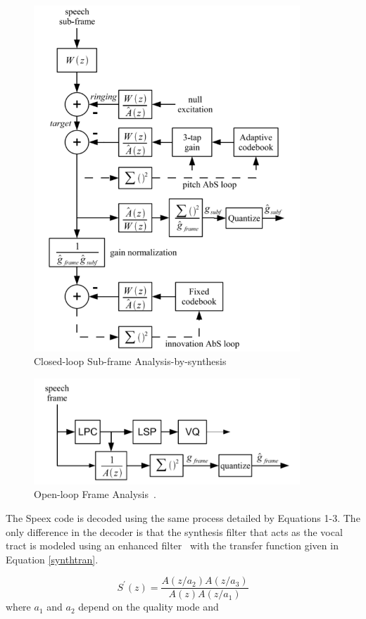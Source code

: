 \documentclass[letterpaper]{article}
\begin{document}
\begin{figure}[h!]
    \centering
    \includegraphics[width=10cm]{closed}
    \caption{Closed-loop Sub-frame Analysis-by-synthesis~\cite{valin2007speex}}
    \label{loopopt}
\end{figure}

\begin{figure}[h!]
    \centering
    \includegraphics[width=10cm]{abs}
    \caption{Open-loop Frame Analysis~\cite{valin2007speex}.}
    \label{abs}
\end{figure}

The Speex code is decoded using the same process detailed by Equations 1-3. The only difference in the decoder is that the synthesis filter that acts as the vocal tract is modeled using an enhanced filter~\cite{valin2007speex} with the transfer function given in Equation \ref{synthtran}.

\begin{equation}\label{synthtran}
    S^\prime(z) = \frac{A(z/a_2)A(z/a_3)}{A(z)A(z/a_1)}
\end{equation}
where $a_1$ and $a_2$ depend on the quality mode and
\end{document}
